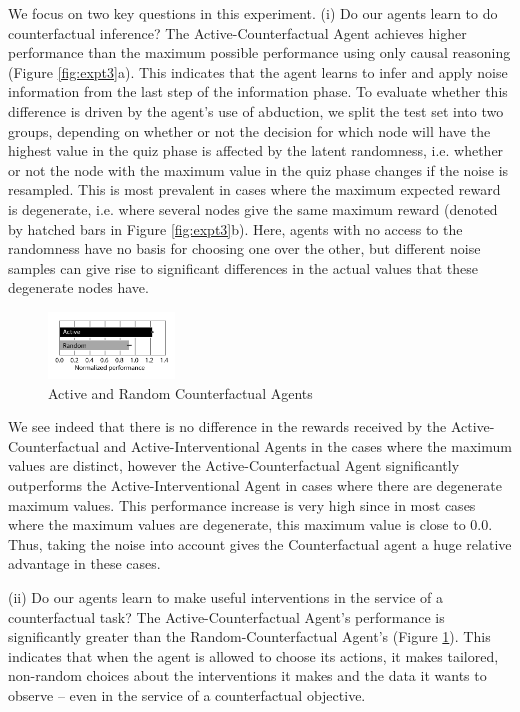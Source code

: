 We focus on two key questions in this experiment. 
(i) Do our agents learn to do counterfactual inference? The Active-Counterfactual Agent achieves higher performance than the maximum possible performance using only causal reasoning (Figure \ref{fig:expt3}a). This indicates that the agent learns to infer and apply noise information from the last step of the information phase. To evaluate whether this difference is driven by the agent's use of abduction, we split the test set into two groups, depending on whether or not the decision for which node will have the highest value in the quiz phase is affected by the latent randomness, i.e. whether or not the node with the maximum value in the quiz phase changes if the noise is resampled.
This is most prevalent in cases where the maximum expected reward is degenerate, i.e. where several nodes give the same maximum reward (denoted by hatched bars in Figure \ref{fig:expt3}b). Here, agents with no access to the randomness have no basis for choosing one over the other, but different noise samples can give rise to significant differences in the actual values that these degenerate nodes have. 

\begin{figure}
\centering
\vspace{-0.4cm}
\includegraphics[width=0.3\textwidth]{figures/fig_counterfactual_act_v_pass.pdf} 
\caption{Active and Random Counterfactual Agents}
\label{fig:expt3_active}
\vspace{-0.4cm}
\end{figure}
We see indeed that there is no difference in the rewards received by the Active-Counterfactual and Active-Interventional Agents in the cases where the maximum values are distinct, however the Active-Counterfactual Agent significantly outperforms the Active-Interventional Agent in cases where there are degenerate maximum values. This performance increase is very high since in most cases where the maximum values are degenerate, this maximum value is close to 0.0. Thus, taking the noise into account gives the Counterfactual agent a huge relative advantage in these cases.

(ii) Do our agents learn to make useful interventions in the service of a counterfactual task?  The Active-Counterfactual Agent's performance is significantly greater than the Random-Counterfactual Agent's (Figure \ref{fig:expt3_active}). This indicates that when the agent is allowed to choose its actions, it makes tailored, non-random choices about the interventions it makes and the data it wants to observe -- even in the service of a counterfactual objective. 



